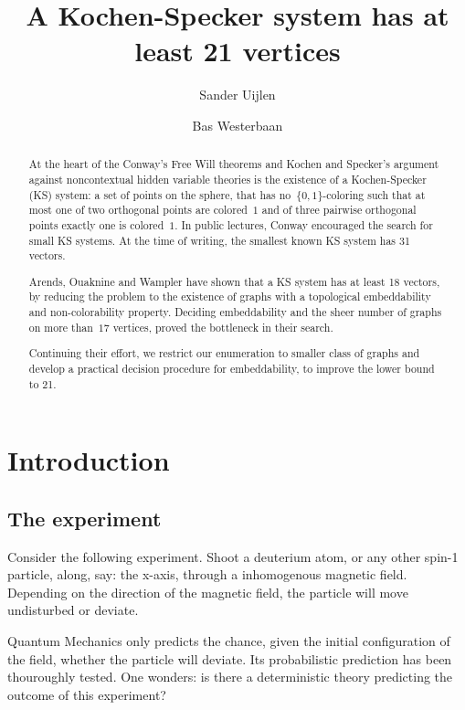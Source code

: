 \documentclass[a4paper]{article}
\title{A Kochen-Specker system has at least 21 vertices}
\author{Sander Uijlen}
\author{Bas Westerbaan}
\affil{Institute for Computing and Information Sciences\\
       Radboud Universiteit Nijmegen\\
   \{\texttt{suijlen},\texttt{bwesterb}\}\texttt{@cs.ru.nl}}
\theoremstyle{definition}
\theoremstyle{remark}
\begin{document}
\maketitle

\begin{abstract}
    At the heart of the Conway's Free Will theorems and Kochen and Specker's
        argument against noncontextual hidden variable theories
    is the existence of a Kochen-Specker (KS) system:
    a set of points on the sphere,
    that has no~$\{0,1\}$-coloring such that
    at most one of two orthogonal points are colored~$1$
    and of three pairwise orthogonal points exactly one
    is colored~$1$.
    In public lectures, Conway encouraged the search for small
    KS systems.  
    At the time of writing, the smallest known
    KS system has 31 vectors.  

    Arends, Ouaknine and Wampler have shown that a KS system has at least
    18 vectors, by reducing the problem to the existence of graphs
    with a topological embeddability and non-colorability property.
    Deciding embeddability and the sheer number of graphs on more than~$17$
    vertices, proved the bottleneck in their search.

    Continuing their effort, we restrict our enumeration to smaller class of
    graphs and develop a practical decision procedure for embeddability, to
    improve the lower bound to 21.
\end{abstract}
    
\section{Introduction}

\subsection{The experiment}

Consider the following experiment.  Shoot a deuterium atom,
or any other spin-1 particle,
along, say: the x-axis, through a inhomogenous magnetic field.
Depending on the direction of the magnetic field,
the particle will move undisturbed
or deviate.

Quantum Mechanics only predicts the chance, given the initial configuration
of the field, whether the particle will deviate.
Its probabilistic prediction has been thouroughly tested.
One wonders: is there a deterministic theory predicting the
outcome of this experiment?
\end{document}
